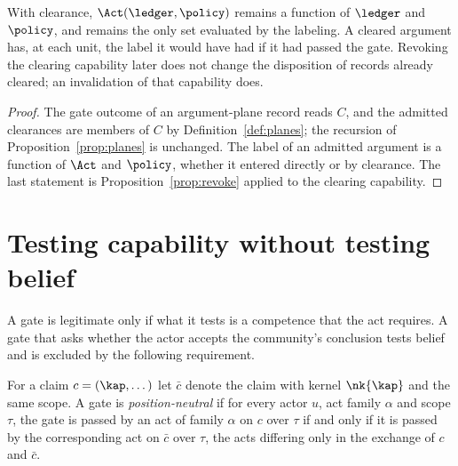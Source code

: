 \begin{proposition}\label{prop:clearance}
With clearance, $\Act(\ledger,\policy)$ remains a function of $\ledger$ and $\policy$, and remains the only set evaluated by the labeling. A cleared argument has, at each unit, the label it would have had if it had passed the gate. Revoking the clearing capability later does not change the disposition of records already cleared; an invalidation of that capability does.
\end{proposition}

\begin{proof}
The gate outcome of an argument-plane record reads $C$, and the admitted clearances are members of $C$ by Definition~\ref{def:planes}; the recursion of Proposition~\ref{prop:planes} is unchanged. The label of an admitted argument is a function of $\Act$ and $\policy$, whether it entered directly or by clearance. The last statement is Proposition~\ref{prop:revoke} applied to the clearing capability.
\end{proof}

\section{Testing capability without testing belief}\label{sec:symmetric}

A gate is legitimate only if what it tests is a competence that the act requires. A gate that asks whether the actor accepts the community's conclusion tests belief and is excluded by the following requirement.

\begin{definition}\label{def:posneutral}
For a claim $c=(\kap,\dots)$ let $\bar c$ denote the claim with kernel $\nk{\kap}$ and the same scope. A gate is \emph{position-neutral} if for every actor $u$, act family $\alpha$ and scope $\tau$, the gate is passed by an act of family $\alpha$ on $c$ over $\tau$ if and only if it is passed by the corresponding act on $\bar c$ over $\tau$, the acts differing only in the exchange of $c$ and $\bar c$.
\end{definition}

